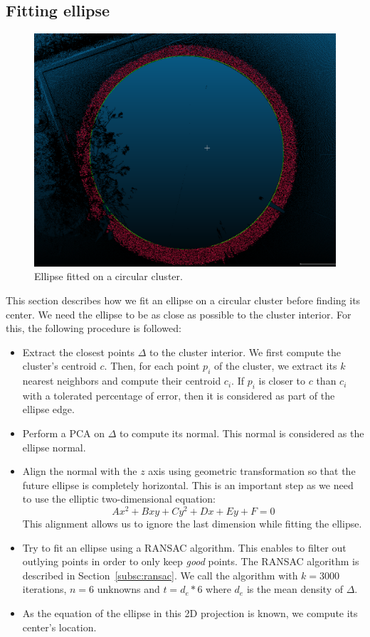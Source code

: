 \subsection{Fitting ellipse}
\label{subsc:fit}
\begin{figure}
  \centering
  \includegraphics[scale=0.4]{img/ellipse.png}
  \caption{Ellipse fitted on a circular cluster.}
  \label{fig:ellipse}
\end{figure}

This section describes how we fit an ellipse on a circular cluster before finding its center. We need the ellipse to be as close as possible to the cluster interior.
For this, the following procedure is followed:
\begin{itemize}
\item Extract the closest points $\Delta$ to the cluster interior. We first compute the cluster's centroid $c$. Then, for each point $p_i$ of the cluster, we extract its $k$ nearest neighbors and compute their centroid $c_i$. If $p_i$ is closer to $c$ than $c_i$ with a tolerated percentage of error, then it is considered as part of the ellipse edge.
\item Perform a PCA on $\Delta$ to compute its normal. This normal is considered as the ellipse normal.
\item Align the normal with the $z$ axis using geometric transformation so that the future ellipse is completely horizontal. This is an important step as we need to use the elliptic two-dimensional equation:
  \begin{equation}
    Ax^2 + Bxy + Cy^2 + Dx + Ey + F = 0
  \end{equation}
  This alignment allows us to ignore the last dimension while fitting the ellipse.
\item Try to fit an ellipse using a RANSAC algorithm. This enables to filter out outlying points in order to only keep \emph{good} points. The RANSAC algorithm is described in Section~\ref{subsc:ransac}. We call the algorithm with $k = 3000$ iterations, $n = 6$ unknowns and $t = d_e * 6$ where $d_e$ is the mean density of $\Delta$.
\item As the equation of the ellipse in this 2D projection is known, we compute its center's location.
\end{itemize}

